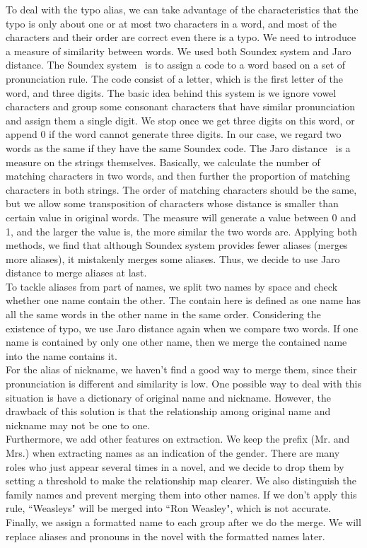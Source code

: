 \documentclass[11pt]{article}
\begin{document}
To deal with the typo alias, we can take advantage of the characteristics that the typo is only about one or at most two characters in a word, and most of the characters and their order are correct even there is a typo. We need to introduce a measure of similarity between words. We used both Soundex system and Jaro distance. The Soundex system~\cite{Soundex} is to assign a code to a word based on a set of pronunciation rule. The code consist of a letter, which is the first letter of the word, and three digits. The basic idea behind this system is we ignore vowel characters and group some consonant characters that have similar pronunciation and assign them a single digit. We stop once we get three digits on this word, or append 0 if the word cannot generate three digits. In our case, we regard two words as the same if they have the same Soundex code. The Jaro distance~\cite{Jaro} is a measure on the strings themselves. Basically, we calculate the number of matching characters in two words, and then further the proportion of matching characters in both strings. The order of matching characters should be the same, but we allow some transposition of characters whose distance is smaller than certain value in original words. The measure will generate a value between 0 and 1, and the larger the value is, the more similar the two words are. Applying both methods, we find that although Soundex system provides fewer aliases (merges more aliases), it mistakenly merges some aliases. Thus, we decide to use Jaro distance to merge aliases at last. \\

To tackle aliases from part of names, we split two names by space and check whether one name contain the other. The contain here is defined as one name has all the same words in the other name in the same order. Considering the existence of typo, we use Jaro distance again when we compare two words. If one name is contained by only one other name, then we merge the contained name into the name contains it. \\

For the alias of nickname, we haven't find a good way to merge them, since their pronunciation is different and similarity is low. One possible way to deal with this situation is have a dictionary of original name and nickname. However, the drawback of this solution is that the relationship among original name and nickname may not be one to one. \\

Furthermore, we add other features on extraction. We keep the prefix (Mr. and Mrs.) when extracting names as an indication of the gender. There are many roles who just appear several times in a novel, and we decide to drop them by setting a threshold to make the relationship map clearer. We also distinguish the family names and prevent merging them into other names. If we don't apply this rule, ``Weasleys" will be merged into ``Ron Weasley", which is not accurate. Finally, we assign a formatted name to each group after we do the merge. We will replace aliases and pronouns in the novel with the formatted names later.
\end{document}
